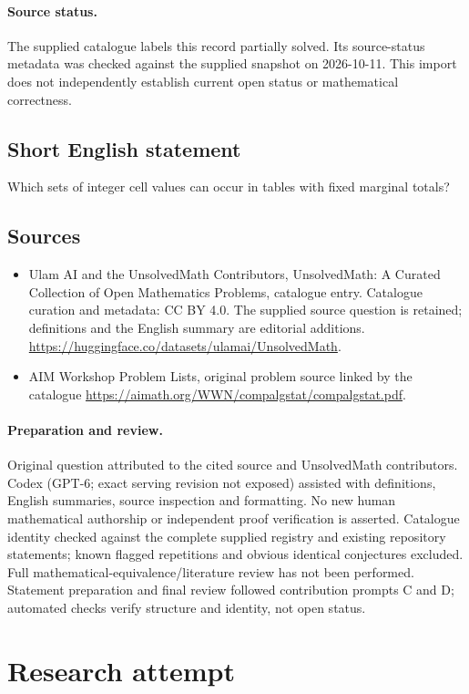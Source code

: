 \documentclass[11pt]{article}
\begin{document}
\paragraph{Source status.}
The supplied catalogue labels this record partially solved. Its source-status metadata was checked against the supplied snapshot on 2026-10-11. This import does not independently establish current open status or mathematical correctness.
\subsection{Short English statement}
Which sets of integer cell values can occur in tables with fixed marginal totals?
\subsection{Sources}
\begin{itemize}
\item[S1] Ulam AI and the UnsolvedMath Contributors, UnsolvedMath: A Curated Collection of Open Mathematics Problems, catalogue entry. Catalogue curation and metadata: CC BY 4.0. The supplied source question is retained; definitions and the English summary are editorial additions.
\url{https://huggingface.co/datasets/ulamai/UnsolvedMath}.
\item[S2] AIM Workshop Problem Lists, original problem source linked by the catalogue
\url{https://aimath.org/WWN/compalgstat/compalgstat.pdf}.
\end{itemize}
\paragraph{Preparation and review.}
Original question attributed to the cited source and UnsolvedMath contributors. Codex (GPT-6; exact serving revision not exposed) assisted with definitions, English summaries, source inspection and formatting. No new human mathematical authorship or independent proof verification is asserted. Catalogue identity checked against the complete supplied registry and existing repository statements; known flagged repetitions and obvious identical conjectures excluded. Full mathematical-equivalence/literature review has not been performed. Statement preparation and final review followed contribution prompts C and D; automated checks verify structure and identity, not open status.
\label{end:statement}


\section{Research attempt}
\end{document}
